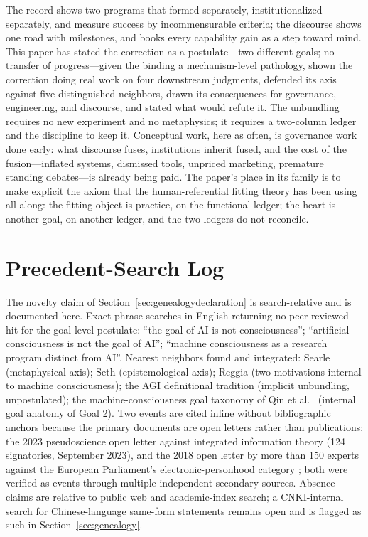 \documentclass[10pt]{article}
\begin{document}
The record shows two programs that formed separately, institutionalized separately, and measure success by incommensurable criteria; the discourse shows one road with milestones, and books every capability gain as a step toward mind. This paper has stated the correction as a postulate---two different goals; no transfer of progress---given the binding a mechanism-level pathology, shown the correction doing real work on four downstream judgments, defended its axis against five distinguished neighbors, drawn its consequences for governance, engineering, and discourse, and stated what would refute it. The unbundling requires no new experiment and no metaphysics; it requires a two-column ledger and the discipline to keep it. Conceptual work, here as often, is governance work done early: what discourse fuses, institutions inherit fused, and the cost of the fusion---inflated systems, dismissed tools, unpriced marketing, premature standing debates---is already being paid. The paper's place in its family is to make explicit the axiom that the human-referential fitting theory has been using all along: the fitting object is practice, on the functional ledger; the heart is another goal, on another ledger, and the two ledgers do not reconcile.

\appendix
\section{Precedent-Search Log}\label{sec:appendix-absence}

The novelty claim of Section~\ref{sec:genealogydeclaration} is search-relative and is documented here. Exact-phrase searches in English returning no peer-reviewed hit for the goal-level postulate: ``the goal of AI is not consciousness''; ``artificial consciousness is not the goal of AI''; ``machine consciousness as a research program distinct from AI''. Nearest neighbors found and integrated: Searle \cite{searle1980} (metaphysical axis); Seth \cite{seth2025conscious} (epistemological axis); Reggia \cite{reggia2013rise} (two motivations internal to machine consciousness); the AGI definitional tradition \cite{goertzel2007agi} (implicit unbundling, unpostulated); the machine-consciousness goal taxonomy of Qin et al.\ \cite{qin2025taxonomy} (internal goal anatomy of Goal 2). Two events are cited inline without bibliographic anchors because the primary documents are open letters rather than publications: the 2023 pseudoscience open letter against integrated information theory (124 signatories, September 2023), and the 2018 open letter by more than 150 experts against the European Parliament's electronic-personhood category \cite{eu2018letter}; both were verified as events through multiple independent secondary sources. Absence claims are relative to public web and academic-index search; a CNKI-internal search for Chinese-language same-form statements remains open and is flagged as such in Section~\ref{sec:genealogy}.
\end{document}
